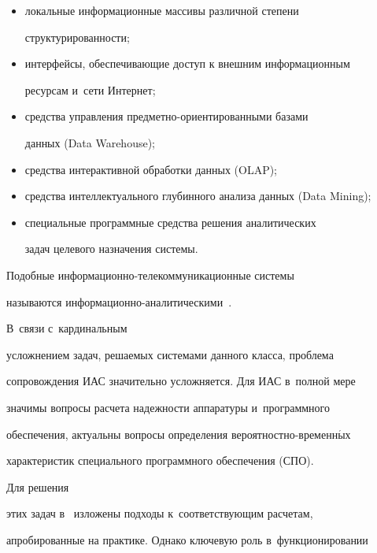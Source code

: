       \begin{itemize}


\item локальные информационные массивы различной степени 


структуриро\-ван\-ности;


\item интерфейсы, обеспечивающие доступ к внешним информационным 


ресурсам и~сети Интернет;


\item средства управления пред\-мет\-но-ори\-ен\-ти\-ро\-ван\-ны\-ми базами 


данных (Data Warehouse);


\item средства интерактивной обработки данных (OLAP);


\item средства интеллектуального глубинного анализа данных (Data Mining);


\item специальные программные средства решения аналитических 


задач целевого назначения системы.


\end{itemize}





      Подобные информационно-телекоммуникационные системы 


называются ин\-фор\-ма\-ци\-он\-но-ана\-ли\-ти\-че\-ски\-ми~\cite{2-bor}. 


В~связи с~кардинальным 


усложнением задач, решаемых системами данного класса, проблема 


сопровождения ИАС значительно усложняется. Для ИАС в~полной мере 


значимы вопросы расчета надежности аппаратуры и~программного 


обеспечения, актуальны вопросы определения ве\-ро\-ят\-но\-ст\-но-вре\-мен\-н$\acute{\mbox{ы}}$х 


характеристик специального программного обеспечения (СПО). 





Для решения 


этих задач в~\cite{1-bor, 3-bor} изложены подходы к~соответствующим расчетам, 


апробированные на практике. Однако ключевую роль в~функционировании 


